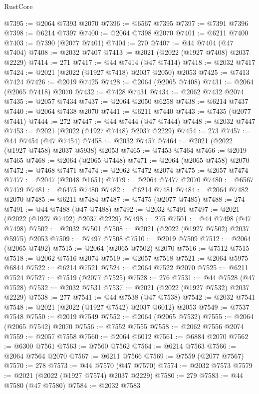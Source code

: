 \begin{lexlean}{RustCore}
\begin{coremodule}
@7395 := @2064 @7393 @2070
@7396 := @6567 @7395
@7397 := @7391 @7396
@7398 := @6214 @7397
@7400 := @2064 @7398 @2070
@7401 := @6211 @7400
@7403 := @7390 (@2077 @7401)
@7404 := 270
@7407 := @44 @7404 (@47 @7404)
@7408 := @2032 @7407
@7413 := @2021 (@2022 (@1927 @7408) @2037 @2229)
@7414 := 271
@7417 := @44 @7414 (@47 @7414)
@7418 := @2032 @7417
@7424 := @2021 (@2022 (@1927 @7418) @2037 @2050) @2053
@7425 := @7413 @7424
@7426 := @2019 @7425
@7428 := @2064 (@2065 @7408)
@7431 := @2064 (@2065 @7418) @2070
@7432 := @7428 @7431
@7434 := @2062 @7432 @2074
@7435 := @2057 @7434
@7437 := @2064 @2050 @6258
@7438 := @6214 @7437
@7440 := @2064 @7438 @2070
@7441 := @6211 @7440
@7443 := @7435 (@2077 @7441)
@7444 := 272
@7447 := @44 @7444 (@47 @7444)
@7448 := @2032 @7447
@7453 := @2021 (@2022 (@1927 @7448) @2037 @2229)
@7454 := 273
@7457 := @44 @7454 (@47 @7454)
@7458 := @2032 @7457
@7464 := @2021 (@2022 (@1927 @7458) @2037 @5938) @2053
@7465 := @7453 @7464
@7466 := @2019 @7465
@7468 := @2064 (@2065 @7448)
@7471 := @2064 (@2065 @7458) @2070
@7472 := @7468 @7471
@7474 := @2062 @7472 @2074
@7475 := @2057 @7474
@7477 := @2047 (@2048 @1651)
@7479 := @2064 @7477 @2070
@7480 := @6567 @7479
@7481 := @6475 @7480
@7482 := @6214 @7481
@7484 := @2064 @7482 @2070
@7485 := @6211 @7484
@7487 := @7475 (@2077 @7485)
@7488 := 274
@7491 := @44 @7488 (@47 @7488)
@7492 := @2032 @7491
@7497 := @2021 (@2022 (@1927 @7492) @2037 @2229)
@7498 := 275
@7501 := @44 @7498 (@47 @7498)
@7502 := @2032 @7501
@7508 := @2021 (@2022 (@1927 @7502) @2037 @5975) @2053
@7509 := @7497 @7508
@7510 := @2019 @7509
@7512 := @2064 (@2065 @7492)
@7515 := @2064 (@2065 @7502) @2070
@7516 := @7512 @7515
@7518 := @2062 @7516 @2074
@7519 := @2057 @7518
@7521 := @2064 @5975 @6844
@7522 := @6214 @7521
@7524 := @2064 @7522 @2070
@7525 := @6211 @7524
@7527 := @7519 (@2077 @7525)
@7528 := 276
@7531 := @44 @7528 (@47 @7528)
@7532 := @2032 @7531
@7537 := @2021 (@2022 (@1927 @7532) @2037 @2229)
@7538 := 277
@7541 := @44 @7538 (@47 @7538)
@7542 := @2032 @7541
@7548 := @2021 (@2022 (@1927 @7542) @2037 @6012) @2053
@7549 := @7537 @7548
@7550 := @2019 @7549
@7552 := @2064 (@2065 @7532)
@7555 := @2064 (@2065 @7542) @2070
@7556 := @7552 @7555
@7558 := @2062 @7556 @2074
@7559 := @2057 @7558
@7560 := @2064 @6012
@7561 := @6884 @2070
@7562 := @6300 @7561
@7563 := @7560 @7562
@7564 := @6214 @7563
@7566 := @2064 @7564 @2070
@7567 := @6211 @7566
@7569 := @7559 (@2077 @7567)
@7570 := 278
@7573 := @44 @7570 (@47 @7570)
@7574 := @2032 @7573
@7579 := @2021 (@2022 (@1927 @7574) @2037 @2229)
@7580 := 279
@7583 := @44 @7580 (@47 @7580)
@7584 := @2032 @7583

\end{coremodule}
\end{lexlean}
